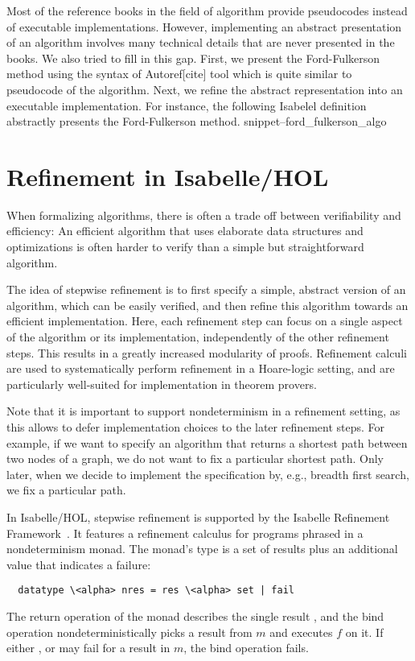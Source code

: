 \documentclass{llncs}
\newcommand{\Snippet}[1]{\csname snippet--#1\endcsname}
\begin{document}
Most of the reference books in the field of algorithm provide pseudocodes instead of executable implementations. However, implementing an abstract presentation of 
an algorithm involves many technical details that are never presented in the books. We also tried to fill in this gap. First, we present the Ford-Fulkerson method using the syntax of Autoref[cite] tool which is quite similar to pseudocode of the algorithm. Next, we refine the abstract representation into an executable implementation. For instance, the following Isabelel definition abstractly presents the Ford-Fulkerson method.
\Snippet{ford_fulkerson_algo}



\section{Refinement in Isabelle/HOL}
When formalizing algorithms, there is often a trade off between verifiability 
and efficiency: An efficient algorithm that uses elaborate data structures and optimizations is often harder to 
verify than a simple but straightforward algorithm. 

The idea of stepwise refinement \cite{Wirth} is to first specify a simple, abstract version of an algorithm, which can be easily verified,
and then refine this algorithm towards an efficient implementation. Here, each refinement step can focus on a single aspect of the algorithm or 
its implementation, independently of the other refinement steps. This results in a greatly increased modularity of proofs. 
Refinement calculi \cite{Back} are used to systematically perform refinement in a Hoare-logic setting, and are particularly well-suited for 
implementation in theorem provers. 

Note that it is important to support nondeterminism in a refinement setting, as this allows to defer 
implementation choices to the later refinement steps. For example, if we want to specify an algorithm 
that returns a shortest path between two nodes of a graph, we do not want to fix a particular shortest path.
Only later, when we decide to implement the specification by, e.g., breadth first search, we fix a particular path.

In Isabelle/HOL, stepwise refinement is supported by the Isabelle Refinement Framework~\cite{LaTu12}. 
It features a refinement calculus for programs phrased in a nondeterminism monad. 
The monad's type is a set of results plus an additional value that indicates a failure:
\begin{lstlisting}
  datatype \<alpha> nres = res \<alpha> set | fail
\end{lstlisting}
The return operation  of the monad describes the single result , and the bind 
operation  nondeterministically picks a result from $m$ and executes $f$ on it. 
If either , or  may fail for a result in $m$, the bind operation fails.
\end{document}

